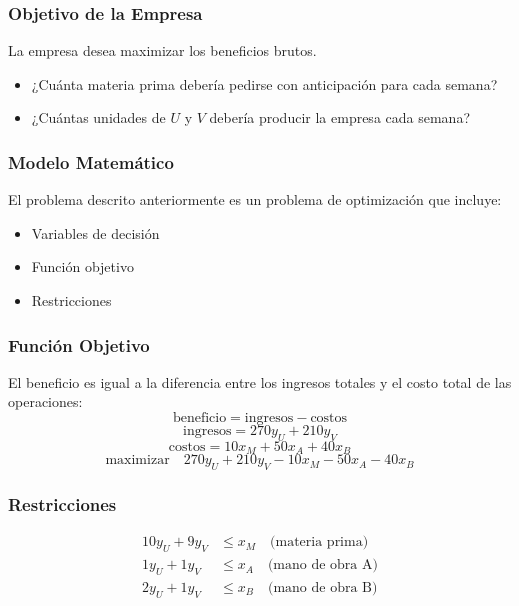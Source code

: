 \documentclass{beamer}
\begin{document}
\begin{frame}
\frametitle{Objetivo de la Empresa}
La empresa desea maximizar los beneficios brutos.

\begin{itemize}
    \item ¿Cuánta materia prima debería pedirse con anticipación para cada semana?
    \item ¿Cuántas unidades de $U$ y $V$ debería producir la empresa cada semana?
\end{itemize}
\end{frame}

\begin{frame}
\frametitle{Modelo Matemático}
El problema descrito anteriormente es un problema de optimización que incluye:
\begin{itemize}
    \item Variables de decisión
    \item Función objetivo
    \item Restricciones
\end{itemize}

\centering
{}
\end{frame}

\begin{frame}
\frametitle{Función Objetivo}
El beneficio es igual a la diferencia entre los ingresos totales y el costo total de las operaciones:
$$
\text{beneficio} = \text{ingresos} - \text{costos}
$$
$$
\text{ingresos} = 270 y_U + 210 y_V
$$
$$
\text{costos} = 10 x_M + 50 x_A + 40 x_B
$$
$$
\text{maximizar} \quad 270 y_U + 210 y_V - 10 x_M - 50 x_A - 40 x_B
$$
\end{frame}

\begin{frame}
\frametitle{Restricciones}
$$
\begin{aligned}
    10 y_U + 9 y_V &\leq x_M \quad \text{(materia prima)} \\
    1 y_U + 1 y_V &\leq x_A \quad \text{(mano de obra A)} \\
    2 y_U + 1 y_V &\leq x_B \quad \text{(mano de obra B)} \\
\end{aligned}
$$
\end{frame}
\end{document}
